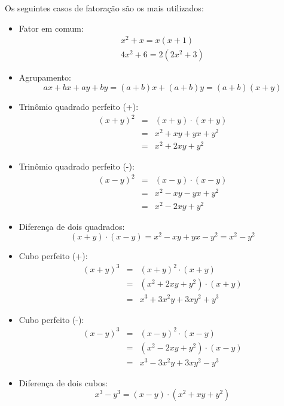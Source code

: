  Os seguintes casos de fatoração são os mais utilizados:
 \begin{itemize}
  \item Fator em comum: 
 \begin{eqnarray}
   x^2 + x= x(x + 1) \\
   4x^2 + 6= 2(2x^2 + 3)
 \end{eqnarray}
  
  \item Agrupamento:
 \begin{equation}
   ax + bx + ay + by= (a+b)x+(a+b)y= (a+b)(x+y)
 \end{equation}
  
  \item Trinômio quadrado perfeito (+): 
\begin{eqnarray}
(x + y)^2&=& (x+y) \cdot (x+y)\\
         &=& x^2 + xy + yx + y^2 \\
         &=& x^2 + 2xy + y^2
\end{eqnarray}

  \item Trinômio quadrado perfeito (-): 
\begin{eqnarray}
(x - y)^2&=& (x - y) \cdot (x - y) \\
         &=& x^2 - xy - yx + y^2 \\
         &=& x^2 - 2xy + y^2
\end{eqnarray}

  \item Diferença de dois quadrados: 
\begin{equation}
(x + y) \cdot (x - y)= x^2 - xy + yx - y^2 = x^2 - y^2
\end{equation}

  \item Cubo perfeito (+): 
\begin{eqnarray}
(x+y)^3&=& (x+y)^2 \cdot (x+y) \\
       &=& (x^2 + 2xy + y^2) \cdot (x+y) \\
       &=& x^3 + 3x^2y + 3xy^2 + y^3
\end{eqnarray}

  \item Cubo perfeito (-): 
\begin{eqnarray}
(x-y)^3&=& (x-y)^2 \cdot (x-y) \\
       &=& (x^2 - 2xy + y^2) \cdot (x-y) \\
       &=& x^3 - 3x^2y + 3xy^2 - y^3
\end{eqnarray}

  \item Diferença de dois cubos:
\begin{equation}
x^3 - y^3= (x-y) \cdot (x^2 + xy + y^2)
\end{equation}
 \end{itemize}
 
